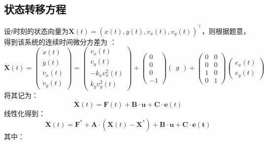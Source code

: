 \documentclass[12pt, onecolumn]{article}
\newcommand\normf{\fangsong}
\begin{document}
	\subsection{\normf 状态转移方程}
	设$t$时刻的状态向量为$\boldsymbol{X}(t)=\left( x(t),y(t),v_x(t),v_y(t)\right) ^\top$，则根据题意，得到该系统的连续时间微分方差为
	：
	\begin{equation}
	\dot{\boldsymbol{X}}(t)=\begin{pmatrix}
	\dot{x}(t)\\\dot{y}(t)\\\dot{v}_x(t)\\\dot{v}_y(t)
	\end{pmatrix}=\begin{pmatrix}
	v_x(t)\\
	v_y(t)\\
	-k_x v^2_x(t)\\
	k_y v^2_y(t)
	\end{pmatrix}+\begin{pmatrix}
	0\\0\\0\\-1
	\end{pmatrix}\begin{pmatrix}
	g
	\end{pmatrix}+\begin{pmatrix}
	0&0\\
	0&0\\
	1&0\\
	0&1
	\end{pmatrix}\begin{pmatrix}
	e_x(t)\\
	e_y(t)
	\end{pmatrix}
	\end{equation}
	将其记为：
	\begin{equation}
	\dot{\boldsymbol{X}}(t)=\boldsymbol{F}(t)+\boldsymbol{B}\cdot\boldsymbol{u}+\boldsymbol{C}\cdot\boldsymbol{e}(t)
	\end{equation}
	线性化得到：
	\begin{equation}
	\dot{\boldsymbol{X}}(t)=\boldsymbol{F^*}+\boldsymbol{A}\cdot\left( \boldsymbol{X}(t)-\boldsymbol{X^*}\right) +\boldsymbol{B}\cdot\boldsymbol{u}+\boldsymbol{C}\cdot\boldsymbol{e(t)}
	\end{equation}
	其中：
\end{document}
